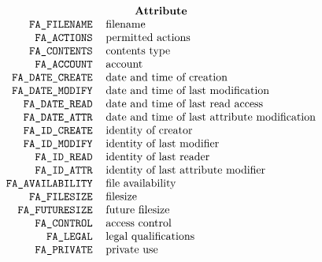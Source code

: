 
\normalsize
\[\begin{tabular}{rl}
    \multicolumn{2}{c}{\bf Attribute}\\
    \tt FA\_FILENAME&		filename\\
    \tt FA\_ACTIONS&		permitted actions\\
    \tt FA\_CONTENTS&		contents type\\
    \tt FA\_ACCOUNT&		account\\
    \tt FA\_DATE\_CREATE&	date and time of creation\\
    \tt FA\_DATE\_MODIFY&	date and time of last modification\\
    \tt FA\_DATE\_READ&		date and time of last read access\\
    \tt FA\_DATE\_ATTR&		date and time of last attribute modification\\
    \tt FA\_ID\_CREATE&		identity of creator\\
    \tt FA\_ID\_MODIFY&		identity of last modifier\\
    \tt FA\_ID\_READ&		identity of last reader\\
    \tt FA\_ID\_ATTR&		identity of last attribute modifier\\
    \tt FA\_AVAILABILITY&	file availability\\
    \tt FA\_FILESIZE&		filesize\\
    \tt FA\_FUTURESIZE&		future filesize\\
    \tt FA\_CONTROL&		access control\\
    \tt FA\_LEGAL&		legal qualifications\\
    \tt FA\_PRIVATE&		private use\\
\end{tabular}\]
